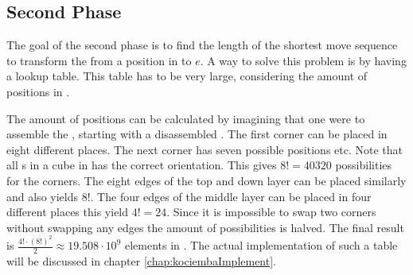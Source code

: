 \subsection{Second Phase}
\label{sub:secondPhase}
The goal of the second phase is to find the length of the shortest move sequence to transform the \rubik{} from a position in  to $e$. A way to solve this problem is by having a lookup table. This table has to be very large, considering the amount of positions in . 

The amount of positions can be calculated by imagining that one were to assemble the \rubik{}, starting with a disassembled \rubik{}. The first corner \cpiece{} can be placed in eight different places. The next corner has seven possible positions etc. Note that all \cpiece{}s in a cube in  has the correct orientation. 
This gives $8! = 40320$ possibilities for the corners. 
The eight edges of the top and down layer can be placed similarly and also yields $8!$.  
The four edges of the middle layer can be placed in four different places this yield $4! = 24$. Since it is impossible to swap two corners without swapping any edges the amount of possibilities is halved. 
The final result is $\frac{4!\cdot(8!)^{2}}{2} \approx 19.508\cdot10^{9}$ elements in .
The actual implementation of such a table will be discussed in chapter \ref{chap:kociembaImplement}.